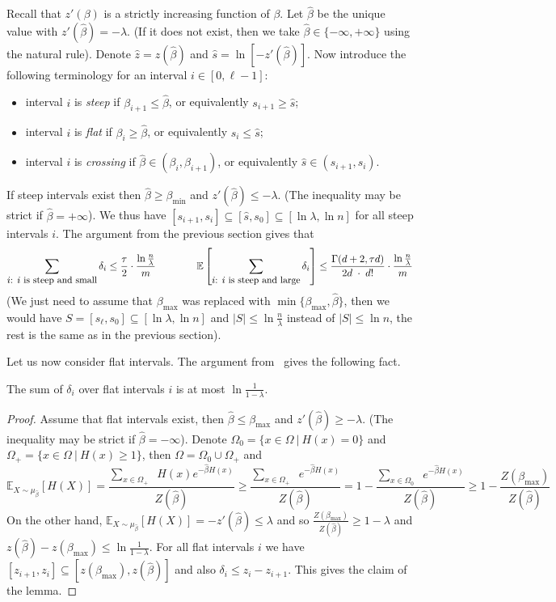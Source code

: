 \documentclass[final,12pt]{colt2018}
\def\bmin{{\beta_{\min}}}
\def\bmax{{\beta_{\max}}}
\def\E{{\mathbb E}}
\begin{document}
Recall that $z'(\beta)$ is a strictly increasing function of $\beta$.
Let $\hat \beta$ be the unique value
with $z'(\hat\beta)=-\lambda$. (If it does not exist, then we take $\hat\beta\in\{-\infty,+\infty\}$ using the natural rule).
Denote  $\hat z=z(\hat\beta)$ and $\hat s=\ln[-z'(\hat\beta)]$.
Now introduce the following terminology for an interval $i\in[0,\ell-1]$:
\begin{itemize}
\item interval $i$ is {\em steep} if  $\beta_{i+1}\le\hat\beta$, or equivalently $s_{i+1}\ge\hat s$;
\item interval $i$ is {\em flat} if  $\beta_{i}\ge\hat\beta$, or equivalently $s_{i}\le\hat s$;
\item interval $i$ is {\em crossing} if  $\hat\beta\in(\beta_{i},\beta_{i+1})$, or equivalently $\hat s\in(s_{i+1},s_{i})$.
\end{itemize}
If steep intervals exist then $\hat\beta\ge\bmin$ and $z'(\hat\beta)\le -\lambda$.
(The inequality may be strict if $\hat\beta=+\infty$).
We thus have $[s_{i+1},s_i]\subseteq[\hat s,s_0]\subseteq[\ln \lambda,\ln n]$ for all steep intervals $i$.
The argument from the previous section gives that 
$$
\sum_{\mbox{\small $i$: $i$ is steep and small}}\delta_i\le \frac{\tau}2 \cdot\frac{\ln\frac n\lambda}m  %
\qquad\qquad
\E\left[\sum_{\mbox{\small $i$: $i$ is steep and large}}\delta_i\right]\le \frac{\Gamma(d+2,\tau d)}{2d\;\cdot \;d!}\cdot\frac{\ln\frac{n}\lambda}m
$$
(We just need to assume that $\bmax$ was replaced with $\min\{\bmax,\hat\beta\}$, then we would have $S=[s_\ell,s_0]\subseteq[\ln \lambda,\ln n]$
and $|S|\le\ln\frac{n}\lambda$ instead of $|S|\le\ln n$, the rest is the same as in the previous section).

 
Let us now consider flat intervals. The argument from~\cite{Huber:Gibbs} gives the following fact.
\begin{lemma} 
The sum of $\delta_i$ over flat intervals $i$ is at most $\ln\frac{1}{1-\lambda}$.
\end{lemma}
\begin{proof}
Assume that flat intervals exist, then $\hat\beta\le\bmax$ and $z'(\hat\beta)\ge -\lambda$.
(The inequality may be strict if $\hat\beta=-\infty$).
Denote $\Omega_0=\{x\in\Omega\:|\:H(x)=0\}$ and $\Omega_+=\{x\in\Omega\:|\:H(x)\ge 1\}$, then $\Omega=\Omega_0\cup\Omega_+$ and
$$
\E_{X\sim\mu_{\hat\beta}}[H(X)]
=\frac{\sum_{x\in\Omega_+}\;\;H(x)e^{-\hat\beta H(x)} }{Z(\hat\beta)}
\ge\frac{\sum_{x\in\Omega_+}\;\;e^{-\hat\beta H(x)} }{Z(\hat\beta)}
=1-\frac{\sum_{x\in\Omega_0}\;\;e^{-\hat\beta H(x)} }{Z(\hat\beta)}
\ge 1-\frac{Z(\bmax)}{Z(\hat\beta)}
$$
On the other hand, $\E_{X\sim\mu_{\hat\beta}}[H(X)]=-z'(\hat\beta)\le \lambda$ and so
$
\frac{Z(\bmax)}{Z(\hat\beta)} %
\ge 1-\lambda
$ and $z(\hat\beta)-z(\bmax)\le \ln\frac 1{1-\lambda}$.
For all flat intervals $i$ we have $[z_{i+1},z_i]\subseteq [z(\bmax),z(\hat\beta)]$
and also $\delta_i\le z_i-z_{i+1}$. This gives the claim of the lemma.
\end{proof}
\end{document}
